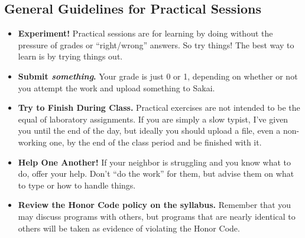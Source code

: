 \subsection*{General Guidelines for Practical Sessions}
\begin{itemize}
\item
{\bf Experiment!} 
Practical sessions are for learning by doing
without the pressure of grades or ``right/wrong'' answers. So try
things!  The best way to learn is by trying things out.
\item
{\bf Submit \textbf{\textit{something}}.} Your grade is just 0 or 1,
depending on whether or not you attempt the work and upload something to 
Sakai. 
\item
{\bf Try to Finish During Class.} Practical exercises are not intended
to be the equal of laboratory assignments. If you are simply a slow
typist, I've given you until the end of the day, but ideally you should
upload a file, even a non-working one, by the end of the class period and 
be finished with it.
\item
{\bf Help One Another!} 
If your neighbor is struggling and you know what
to do, offer your help. Don't ``do the work'' for them, but advise them on what
to type or how to handle things.
\item
{\bf Review the Honor Code policy on the syllabus.} Remember that you
may discuss programs with others, but programs that are nearly identical
to others will be taken as evidence of violating the Honor Code.
\end{itemize}

